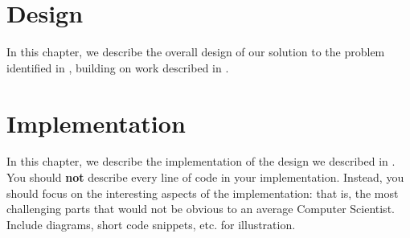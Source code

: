 \chapter{Design}
\label{ch:design}

In this chapter, we describe the overall design of our solution to the problem identified in , building on work described in .

\chapter{Implementation}
\label{ch:implementation}

In this chapter, we describe the implementation of the design we described in . You should \textbf{not} describe every line of code in your implementation. Instead, you should focus on the interesting aspects of the implementation: that is, the most challenging parts that would not be obvious to an average Computer Scientist. Include diagrams, short code snippets, etc. for illustration. 

